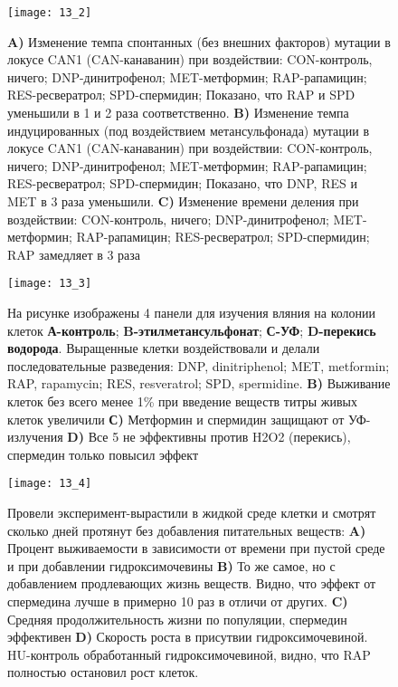 \begin{figure}[H]
	\centering
	\texttt{[image: 13\_2]}
	\caption{\textbf{A)}	Изменение темпа спонтанных (без внешних факторов) мутации в локусе CAN1 (CAN-канаванин) при воздействии: CON-контроль, ничего; DNP-динитрофенол; MET-метформин; RAP-рапамицин; RES-ресвератрол; SPD-спермидин; Показано, что RAP и SPD уменьшили в 1 и 2 раза соответственно.
		\textbf{B)}	Изменение темпа индуцированных (под воздействием метансульфонада) мутации в локусе CAN1 (CAN-канаванин) при воздействии: CON-контроль, ничего; DNP-динитрофенол; MET-метформин; RAP-рапамицин; RES-ресвератрол; SPD-спермидин; Показано, что  DNP, RES и MET в 3 раза уменьшили.
		\textbf{C)}	Изменение времени деления при воздействии: CON-контроль, ничего; DNP-динитрофенол; MET-метформин; RAP-рапамицин; RES-ресвератрол; SPD-спермидин; RAP замедляет в 3 раза
	}
\end{figure}

\begin{figure}[H]
	\centering
	\texttt{[image: 13\_3]}
	\caption{На рисунке изображены 4 панели для изучения вляния на колонии клеток \textbf{А-контроль}; \textbf{B-этилметансульфонат}; \textbf{С-УФ}; \textbf{D-перекись водорода}. Выращенные клетки воздействовали и делали последовательные разведения: DNP, dinitriphenol; MET, metformin; RAP, rapamycin; RES, resveratrol; SPD, spermidine.
	\textbf{B)} Выживание клеток без всего менее 1\% при введение веществ титры живых клеток увеличили
	\textbf{С)} Метформин и спермидин защищают от УФ-излучения
	\textbf{D)} Все 5 не эффективны против H2O2 (перекись), спермедин только повысил эффект 
}
\end{figure}


\begin{figure}[H]
	\centering
	\texttt{[image: 13\_4]}
	\caption{Провели эксперимент-вырастили в жидкой среде клетки и смотрят сколько дней протянут без добавления питательных веществ:
		\textbf{A)}	Процент выживаемости в зависимости от времени при пустой среде и при добавлении гидроксимочевины
		\textbf{B)} То же самое, но с добавлением продлевающих жизнь веществ. Видно, что эффект от спермедина лучше в примерно 10 раз в отличи от других.
	\textbf{C)}	Средняя продолжительность жизни по популяции, спермедин эффективен
	\textbf{D)}	Скорость роста в присутвии гидроксимочевиной. HU-контроль обработанный гидроксимочевиной, видно, что RAP полностью остановил рост клеток.
}
\end{figure}


